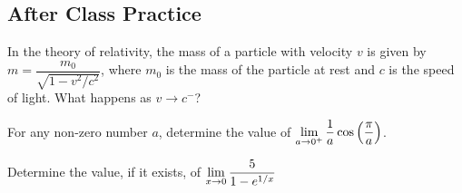 \documentclass[notes]{subfiles}
\begin{document}
	\subsection*{After Class Practice}
		\begin{ex}
			In the theory of relativity, the mass of a particle with velocity \(v\) is given by \(m = \dfrac{m_0}{\sqrt{1-v^2/c^2}}\), where \(m_0\) is the mass of the particle at rest and \(c\) is the speed of light.  What happens as \(v\to c^-\)?
		\end{ex}
			
		\begin{ex}
			For any non-zero number \(a\), determine the value of \(\displaystyle \lim_{a\to 0^+} \dfrac{1}{a}\cos \left( \dfrac{\pi}{a}\right)\).
		\end{ex}
			
		\begin{ex}
			Determine the value, if it exists, of \(\displaystyle \lim_{x\to 0} \dfrac{5}{1-e^{1/x}}\)
		\end{ex}
	
\clearpage
\end{document}
